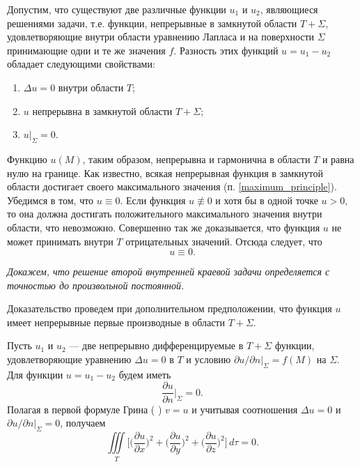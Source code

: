 Допустим, что существуют две различные функции $u_1$ и $u_2$, являющиеся решениями задачи, т.е. функции, непрерывные в замкнутой области $T + \Sigma$, удовлетворяющие внутри области уравнению Лапласа и на поверхности $\Sigma$ принимающие одни и те же значения $f$. Разность этих функций $u = u_1 - u_2$ обладает следующими свойствами:
\begin{enumerate}
	\item $\Delta u = 0$ внутри области $T$;
	
	\item $u$ непрерывна в замкнутой области $T + \Sigma$;
	
	\item $u|_{\Sigma} = 0.$
\end{enumerate}

Функцию $u(M)$, таким образом, непрерывна и гармонична в области $T$ и равна нулю на границе. Как известно, всякая непрерывная функция в замкнутой области достигает своего максимального значения (п. \ref{maximum_principle}). Убедимся в том, что $u \equiv 0$. Если функция $u \not \equiv 0$ и хотя бы в одной точке $u > 0$, то она должна достигать положительного максимального значения внутри области, что невозможно. Совершенно так же доказывается, что функция $u$ не может принимать внутри $T$ отрицательных значений. Отсюда следует, что 
\begin{equation*}
	u \equiv 0.
\end{equation*}

\textit{Докажем, что решение второй внутренней краевой задачи определяется с точностью до произвольной постоянной.}

Доказательство проведем при дополнительном предположении, что функция $u$ имеет непрерывные первые производные в области $T + \Sigma$. 

Пусть $u_1$ и $u_2$ --- две непрерывно дифференцируемые в $T + \Sigma$ функции, удовлетворяющие уравнению $\Delta u = 0$ в $T$ и условию $\partial u/ \partial n |_{\Sigma} = f(M)$ на $\Sigma$. Для функции $u = u_1 - u_2$ будем иметь 
\begin{equation*}
	\frac{\partial u}{\partial n} \Big|_{\Sigma} = 0.
\end{equation*}
Полагая в первой формуле Грина (%
) $v = u$ и учитывая соотношения $\Delta u = 0$ и $\partial u / \partial n |_{\Sigma} = 0$, получаем 
\begin{equation*}
	 \iiint \limits_{T} \Big[\Bigg(\frac{\partial u}{\partial x}\Bigg)^2 + \Bigg(\frac{\partial u}{\partial y}\Bigg)^2 + \Bigg(\frac{\partial u}{\partial z}\Bigg)^2\Bigg] \, d\tau = 0.
\end{equation*}

